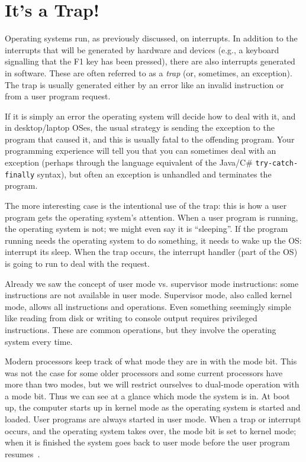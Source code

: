 \documentclass[a4paper]{report}
\begin{document}
\section*{It's a Trap!}
Operating systems run, as previously discussed, on interrupts. In addition to the interrupts that will be generated by hardware and devices (e.g., a keyboard signalling that the F1 key has been pressed), there are also interrupts generated in software. These are often referred to as a \textit{trap} (or, sometimes, an exception). The trap is usually generated either by an error like an invalid instruction or from a user program request.

If it is simply an error the operating system will decide how to deal with it, and in desktop/laptop OSes, the usual strategy is sending the exception to the program that caused it, and this is usually fatal to the offending program. Your programming experience will tell you that you can sometimes deal with an exception (perhaps through the language equivalent of the Java/C\# \texttt{try-catch-finally} syntax), but often an exception is unhandled and terminates the program.

The more interesting case is the intentional use of the trap: this is how a user program gets the operating system's attention. When a user program is running, the operating system is not; we might even say it is ``sleeping''. If the program running needs the operating system to do something, it needs to wake up the OS: interrupt its sleep. When the trap occurs, the interrupt handler (part of the OS) is going to run to deal with the request.

Already we saw the concept of user mode vs. supervisor mode instructions: some instructions are not available in user mode. Supervisor mode, also called kernel mode, allows all instructions and operations. Even something seemingly simple like reading from disk or writing to console output requires privileged instructions. These are common operations, but they involve the operating system every time.

Modern processors keep track of what mode they are in with the mode bit. This was not the case for some older processors and some current processors have more than two modes, but we will restrict ourselves to dual-mode operation with a mode bit. Thus we can see at a glance which mode the system is in. At boot up, the computer starts up in kernel mode as the operating system is started and loaded. User programs are always started in user mode. When a trap or interrupt occurs, and the operating system takes over, the mode bit is set to kernel mode; when it is finished the system goes back to user mode before the user program resumes~\cite{osc}.
\end{document}
